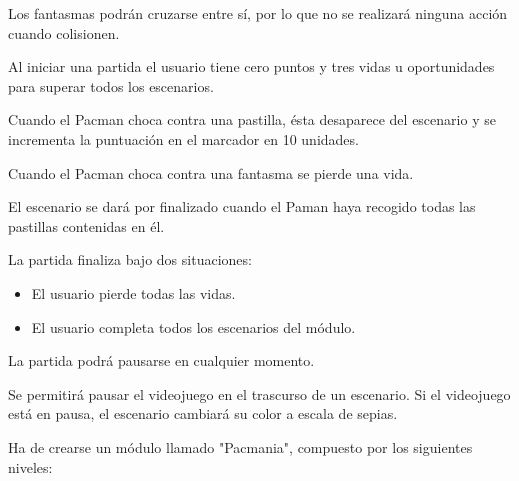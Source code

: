\begin{description}
 {Los fantasmas podrán cruzarse entre sí, por lo que no se realizará ninguna acción cuando colisionen.} 

 {Al iniciar una partida el usuario tiene cero puntos y tres vidas u oportunidades para superar todos los escenarios.}

 {Cuando el Pacman choca contra una pastilla, ésta desaparece del escenario y se incrementa la puntuación en el marcador en 10 unidades.}

 {Cuando el Pacman choca contra una fantasma se pierde una vida.  } 

 {El escenario se dará por finalizado cuando el Paman haya recogido todas las pastillas contenidas en él.}

 {La partida finaliza bajo dos situaciones:
	\begin{itemize}
	\item El usuario pierde todas las vidas. 
	\item El usuario completa todos los escenarios del módulo.
	\end{itemize}
}

 {La partida podrá pausarse en cualquier momento.}

 {Se permitirá pausar el videojuego en el trascurso de un escenario. Si el videojuego está en pausa, el escenario cambiará su color a escala de sepias.}

 {Ha de crearse un módulo llamado "Pacmania", compuesto por los siguientes niveles: 
	\begin{figure}[!h]
		\centering	
	\end{figure}

}
\end{description}
